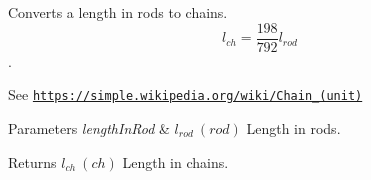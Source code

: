 Converts a length in rods to chains. \[ l_{ch}= \frac{198}{792} l_{rod} \]. 

See \href{https://simple.wikipedia.org/wiki/Chain_(unit)}{\tt https\+://simple.\+wikipedia.\+org/wiki/\+Chain\+\_\+(unit)} 
\begin{DoxyParams}{Parameters}
{\em length\+In\+Rod} & $ l_{rod}\ (rod)$ Length in rods. \\
\hline
\end{DoxyParams}
\begin{DoxyReturn}{Returns}
$ l_{ch}\ (ch)$ Length in chains. 
\end{DoxyReturn}
